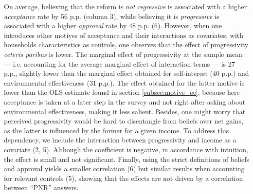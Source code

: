 \documentclass[12pt]{article} %
\begin{document}
On average, believing that the reform is \textit{not regressive} is associated with a higher \textit{acceptance} rate by 56 p.p. (column 3), while believing it is \textit{progressive} is associated with a higher \textit{approval} rate by 48 p.p. (6). However, when one introduces other motives of acceptance and their interactions as covariates, with households characteristics as controls, one observes that the effect of progressivity \textit{ceteris paribus} is lower. The marginal effect of progressivity at the sample mean --- i.e. accounting for the average marginal effect of interaction terms --- is 27 p.p., slightly lower than the marginal effect obtained for self-interest (40 p.p.) and environmental effectiveness (31 p.p.). The effect obtained for the latter motive is lower than the OLS estimate found in section \ref{subsec:motive_ee}, because here acceptance is taken at a later step in the survey and not right after asking about environmental effectiveness, making it less salient. Besides, one might worry that perceived progressivity would be hard to disentangle from beliefs over net gains, as the latter is influenced by the former for a given income. To address this dependency, we include the interaction between progressivity and income as a covariate (2, 5). Although the coefficient is negative, in accordance with intuition, the effect is small and not significant. Finally, using the strict definitions of beliefs and approval yields a smaller correlation (6) but similar results when accounting for relevant controls (5), showing that the effects are not driven by a correlation between ``PNR'' answers.

\end{document}

